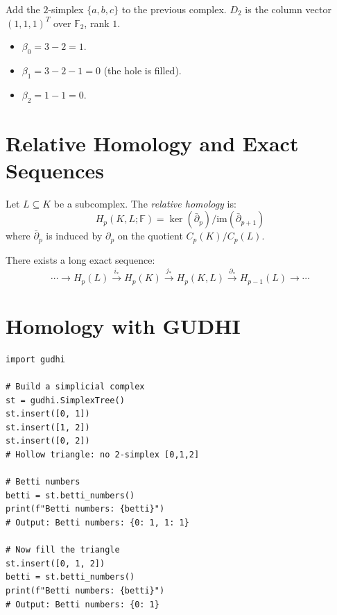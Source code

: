 \begin{example}
Add the $2$-simplex $\{a,b,c\}$ to the previous complex.
$D_2$ is the column vector $(1, 1, 1)^T$ over $\mathbb{F}_2$, rank $1$.
\begin{itemize}
  \item $\beta_0 = 3 - 2 = 1$.
  \item $\beta_1 = 3 - 2 - 1 = 0$ (the hole is filled).
  \item $\beta_2 = 1 - 1 = 0$.
\end{itemize}
\end{example}

\section{Relative Homology and Exact Sequences}

\begin{definition}
Let $L \subseteq K$ be a subcomplex. The \emph{relative homology} is:
\[
  H_p(K, L; \mathbb{F}) = \ker(\bar{\partial}_p) / \mathrm{im}(\bar{\partial}_{p+1})
\]
where $\bar{\partial}_p$ is induced by $\partial_p$ on the quotient
$C_p(K)/C_p(L)$.
\end{definition}

\begin{theorem}
There exists a long exact sequence:
\[
  \cdots \to H_p(L) \xrightarrow{i_*} H_p(K)
  \xrightarrow{j_*} H_p(K, L)
  \xrightarrow{\partial_*} H_{p-1}(L) \to \cdots
\]
\end{theorem}

\section{Homology with GUDHI}

\begin{codeblock}[title=\textbf{Homology Computation with GUDHI}]
\begin{verbatim}
import gudhi

# Build a simplicial complex
st = gudhi.SimplexTree()
st.insert([0, 1])
st.insert([1, 2])
st.insert([0, 2])
# Hollow triangle: no 2-simplex [0,1,2]

# Betti numbers
betti = st.betti_numbers()
print(f"Betti numbers: {betti}")
# Output: Betti numbers: {0: 1, 1: 1}

# Now fill the triangle
st.insert([0, 1, 2])
betti = st.betti_numbers()
print(f"Betti numbers: {betti}")
# Output: Betti numbers: {0: 1}
\end{verbatim}
\end{codeblock}

